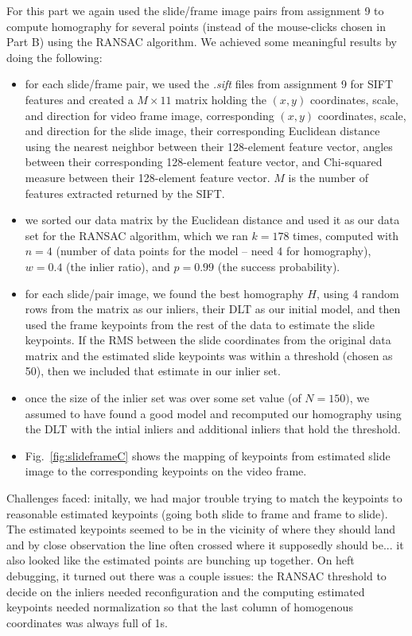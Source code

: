 For this part we again used the slide/frame image pairs from assignment 9 to compute homography for several points (instead of the mouse-clicks chosen in Part B) using the RANSAC algorithm. We achieved some meaningful results by doing the following: 

\begin{itemize}
	\item for each slide/frame pair, we used the {\it .sift} files from assignment 9 for SIFT features and created a $M \times 11$ matrix holding the $(x, y)$ coordinates, scale, and direction for video frame image, corresponding $(x, y)$ coordinates, scale, and direction for the slide image, their corresponding Euclidean distance using the nearest neighbor between their 128-element feature vector, angles between their corresponding 128-element feature vector, and Chi-squared measure between their 128-element feature vector. $M$ is the number of features extracted returned by the SIFT. 
	\item we sorted our data matrix by the Euclidean distance and used it as our data set for the RANSAC algorithm, which we ran $k = 178$ times, computed with $n=4$ (number of data points for the model -- need 4 for homography), $w = 0.4$ (the inlier ratio), and $p=0.99$ (the success probability).
	\item for each slide/pair image, we found the best homography $H$, using 4 random rows from the matrix as our inliers, their DLT as our initial model, and then used the frame keypoints from the rest of the data to estimate the slide keypoints. If the RMS between the slide coordinates from the original data matrix and the estimated slide keypoints was within a threshold (chosen as 50), then we included that estimate in our inlier set. 
	\item once the size of the inlier set was over some set value (of $N=150)$, we assumed to have found a good model and recomputed our homography using the DLT with the intial inliers and additional inliers that hold the threshold. 
	\item Fig.~\ref{fig:slideframeC} shows the mapping of keypoints from estimated slide image to the corresponding keypoints on the video frame.  
\end{itemize}

Challenges faced: initally, we had major trouble trying to match the keypoints to reasonable estimated keypoints (going both slide to frame and frame to slide). The estimated keypoints seemed to be in the vicinity of where they should land and by close observation the line often crossed where it supposedly should be... it also looked like the estimated points are bunching up together. On heft debugging, it turned out there was a couple issues: the RANSAC threshold to decide on the inliers needed reconfiguration and the computing estimated keypoints needed normalization so that the last column of homogenous coordinates was always full of 1s. 

